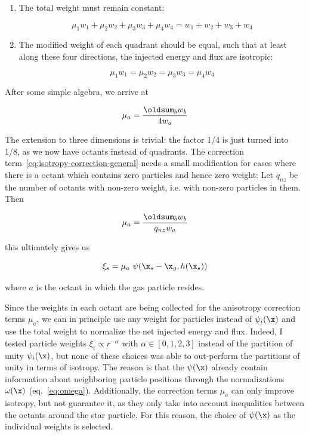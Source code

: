 \begin{enumerate}
    \item The total weight must remain constant:

\begin{equation}
\mu_1 w_1 + \mu_2 w_2 + \mu_3 w_3 + \mu_4 w_4 = w_1 + w_2 + w_3 + w_4
\end{equation}

    \item The modified weight of each quadrant should be equal, such that at least along these four
    directions, the injected energy and flux are isotropic:

\begin{equation}
\mu_1 w_1 = \mu_2 w_2 = \mu_3 w_3 = \mu_4 w_4
\end{equation}

\end{enumerate}

After some simple algebra, we arrive at

\begin{equation}
\mu_a = \frac{\oldsum_b w_b}{4 w_a} \label{eq:isotropy-correction-general}
\end{equation}

The extension to three dimensions is trivial: the factor 1/4 is just turned into 1/8, as we now
have octants instead of quadrants. The correction term~\ref{eq:isotropy-correction-general} needs a
small modification for cases where there is a octant which contains zero particles and hence zero
weight: Let $q_{nz}$ be the number of octants with non-zero weight, i.e. with non-zero particles
in them. Then

\begin{equation}
	\mu_a = \frac{\oldsum_b w_b}{q_{nz} w_a} \label{eq:isotropy-correction-with-zero}
\end{equation}


this ultimately gives us

\begin{align}
    \xi_s = \mu_a \ \psi(\x_{s} - \x_{g}, h(\x_{s}))
\end{align}

where $a$ is the octant in which the gas particle resides.


Since the weights in each octant are being collected for the anisotropy correction terms $\mu_a$,
we can in principle use any weight for particles instead of $\psi_i(\x)$ and use the total weight
to normalize the net injected energy and flux. Indeed, I tested particle weights $\xi_i \propto
r^{-\alpha}$ with $\alpha \in [0, 1, 2, 3]$ instead of the partition of unity $\psi_i(\x)$, but
none of these choices was able to out-perform the partitions of unity in terms of isotropy. The
reason is that the $\psi(\x)$ already contain information about neighboring particle positions
through the normalizations $\omega(\x)$ (eq.~\ref{eq:omega}). Additionally, the correction terms
$\mu_a$ can only improve isotropy, but not guarantee it, as they only take into account inequalities
between the octants around the star particle. For this reason, the choice of $\psi(\x)$ as the
individual weights is selected.



